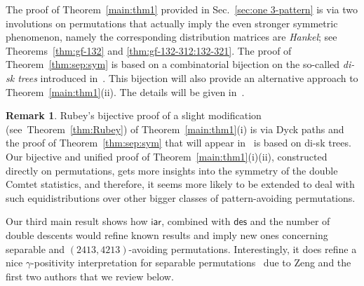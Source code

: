 \documentclass[12pt]{amsart}
\numberwithin{equation}{section}
\theoremstyle{plain}
\theoremstyle{definition}
\newtheorem{remark}[theorem]{Remark}
\def\des{\mathsf{des}}
\def\iar{\mathsf{iar}}
\begin{document}
The proof of Theorem~\ref{main:thm1} provided in Sec.~\ref{sec:one 3-pattern} is via two involutions on permutations that actually imply the even stronger symmetric phenomenon, namely the corresponding distribution matrices are {\em Hankel}; see Theorems~\ref{thm:gf-132} and \ref{thm:gf-132-312:132-321}. The proof of Theorem~\ref{thm:sep:sym} is based on a combinatorial bijection on the so-called {\em di-sk trees} introduced in~\cite{flz}. This bijection will also provide an alternative approach to Theorem~\ref{main:thm1}(ii). The details will be given in~\cite{flw2}. 

\begin{remark}  Rubey's bijective proof of a slight modification (see~Theorem~\ref{thm:Rubey}) of Theorem~\ref{main:thm1}(i) is via Dyck paths and the proof of Theorem~\ref{thm:sep:sym} that will appear in~\cite{flw2} is based on di-sk trees. Our bijective and unified proof of Theorem~\ref{main:thm1}(i)(ii), constructed directly on permutations, gets more insights into the symmetry of the double Comtet statistics, and therefore, it seems more likely to be extended to deal with such equidistributions over other bigger classes of pattern-avoiding permutations. 
\end{remark}

Our third main result shows how $\iar$, combined with $\des$ and the number of double descents would refine known results and imply new ones concerning separable and $(2413,4213)$-avoiding permutations. Interestingly, it does refine a nice $\gamma$-positivity interpretation for separable permutations~\cite{flz,lin} due to Zeng and the first two authors that we review below. 
\end{document}
